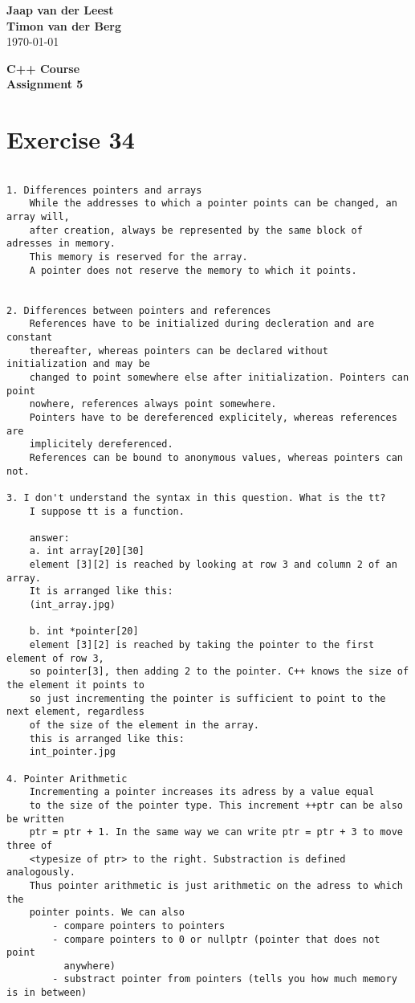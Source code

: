 \documentclass{article}[9pt]
\begin{document}
\begin{flushright}
	\textbf{Jaap van der Leest\\ Timon van der Berg \\ }
\today
\end{flushright}

\begin{center}
\textbf{C++ Course \\
Assignment 5} \\
\end{center}

\section*{Exercise 34}
\begin{verbatim}

1. Differences pointers and arrays
    While the addresses to which a pointer points can be changed, an array will,
    after creation, always be represented by the same block of adresses in memory. 
    This memory is reserved for the array. 
    A pointer does not reserve the memory to which it points. 


2. Differences between pointers and references
    References have to be initialized during decleration and are constant
    thereafter, whereas pointers can be declared without initialization and may be
    changed to point somewhere else after initialization. Pointers can point
    nowhere, references always point somewhere.
    Pointers have to be dereferenced explicitely, whereas references are
    implicitely dereferenced. 
    References can be bound to anonymous values, whereas pointers can not. 

3. I don't understand the syntax in this question. What is the tt?
    I suppose tt is a function.

    answer:
    a. int array[20][30] 
    element [3][2] is reached by looking at row 3 and column 2 of an array.
    It is arranged like this:
    (int_array.jpg)

    b. int *pointer[20]
    element [3][2] is reached by taking the pointer to the first element of row 3,
    so pointer[3], then adding 2 to the pointer. C++ knows the size of the element it points to
    so just incrementing the pointer is sufficient to point to the next element, regardless
    of the size of the element in the array.
    this is arranged like this:
    int_pointer.jpg 
    
4. Pointer Arithmetic   
    Incrementing a pointer increases its adress by a value equal
    to the size of the pointer type. This increment ++ptr can be also be written
    ptr = ptr + 1. In the same way we can write ptr = ptr + 3 to move three of 
    <typesize of ptr> to the right. Substraction is defined analogously. 
    Thus pointer arithmetic is just arithmetic on the adress to which the
    pointer points. We can also 
        - compare pointers to pointers
        - compare pointers to 0 or nullptr (pointer that does not point
          anywhere)
        - substract pointer from pointers (tells you how much memory is in between)


\end{verbatim}
\end{document}
